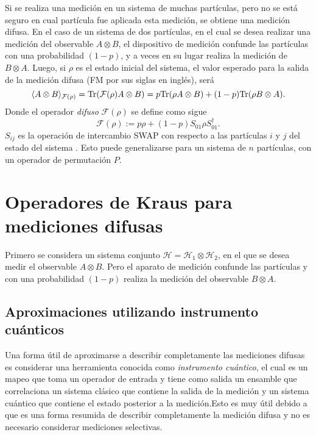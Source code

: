 Si se  realiza una  medición en un sistema de muchas partículas, pero no se
está seguro en cual partícula  fue aplicada esta medición, se obtiene una
medición difusa. En el caso de un sistema de dos partículas, en el cual se
desea realizar una medición del observable $A\otimes B$, el dispositivo de
medición confunde las partículas con una probabilidad $(1-p)$, y a veces en su
lugar realiza la medición de $B\otimes A$. Luego, si $\rho$ es el estado
inicial del sistema, el valor esperado para la salida de la medición difusa (FM
por sus siglas en inglés), será 
\begin{equation}
    \langle A\otimes B\rangle_{\mathcal{F}(\rho)}={\rm Tr}(\mathcal{F}(\rho)A\otimes B)=p{\rm Tr}(\rho A\otimes B)+(1-p){\rm Tr}(\rho B\otimes A).
\end{equation}
Donde el operador \textit{difuso }$\mathcal{F}(\rho)$ se define como sigue 
\begin{equation}\label{operador_difuso}
    \mathcal{F}(\rho):=p\rho+(1-p)S_{01}\rho S_{01}^\dagger.
\end{equation}
$S_{ij}$ es la operación de intercambio SWAP con respecto a las
partículas $i$ y $j$ del estado del sistema {\cite{Pineda_2021}} . Esto puede
generalizarse para un sistema de $n$ partículas, con un operador de permutación
$P$.

 \section{Operadores de Kraus para mediciones difusas} %

 Primero se considera un sistema conjunto $\mathcal{H}=\mathcal{H}_1\otimes
\mathcal{H}_2$, en el que se desea medir el observable $A\otimes B$. Pero el
aparato de medición confunde las partículas y con una probabilidad $(1-p) $
realiza la medición del observable $B\otimes A$. %
   
\subsection{Aproximaciones utilizando instrumento cuánticos} %

Una forma útil de aproximarse a describir completamente las mediciones difusas
es considerar una herramienta conocida como \textit{instrumento cuántico}, el
cual es un mapeo que toma un operador de entrada y tiene como salida un
ensamble que correlaciona un sistema clásico que contiene la salida de la
medición y un sistema cuántico que contiene el estado posterior a la medición.Esto es muy útil debido a que es una forma resumida
de describir completamente la medición difusa y no es necesario considerar
mediciones selectivas. 


